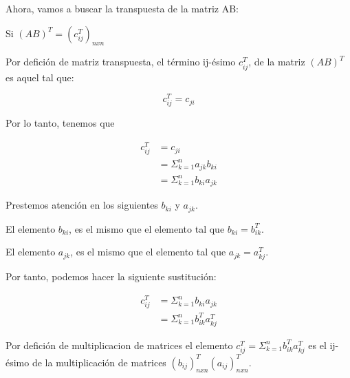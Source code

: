 Ahora, vamos a buscar la transpuesta de la matriz AB:

\vspace*{0.3cm}

Si $(AB)^{T} = \left( c_{ij}^{T} \right)_{nxn} $

\vspace*{0.3cm}

Por defición de matriz transpuesta, el término ij-ésimo $ c_{ij}^{T} $,
de la matriz $(AB)^{T}$ es aquel tal que:

\begin{equation*}
    c_{ij}^{T} = c_{ji}
\end{equation*}

Por lo tanto, tenemos que

\begin{align*}
    c_{ij}^{T} & = c_{ji}                         \\
               & = \Sigma_{k=1}^{n} a_{jk} b_{ki} \\
               & = \Sigma_{k=1}^{n} b_{ki} a_{jk}
\end{align*}

\vspace*{0.3cm}

Prestemos atención en los siguientes $b_{ki}$ y $a_{jk}$.

\vspace*{0.15cm}

El elemento $b_{ki}$, es el mismo que el elemento
tal que $b_{ki}=b_{ik}^{T}$.

\vspace*{0.15cm}

El elemento $a_{jk}$, es el mismo que el elemento
tal que $a_{jk}=a_{kj}^{T}$.

\vspace*{0.15cm}

Por tanto, podemos hacer la siguiente sustitución:

\vspace*{0.3cm}

\begin{align*}
    c_{ij}^{T} & = \Sigma_{k=1}^{n} b_{ki} a_{jk}         \\
               & = \Sigma_{k=1}^{n} b_{ik}^{T} a_{kj}^{T}
\end{align*}

Por defición de multiplicacion de matrices el elemento
$ c_{ij}^{T} = \Sigma_{k=1}^{n} b_{ik}^{T} a_{kj}^{T} $ es el ij-ésimo de la multiplicación de
matrices $ \left(b_{ij}\right)_{nxn}^{T} \left(a_{ij}\right)_{nxn}^{T} $.

